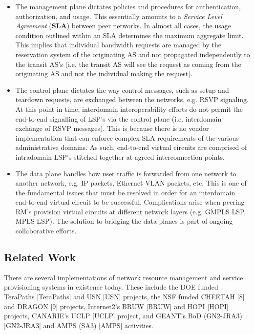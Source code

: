 \documentclass[conference]{IEEEtran}
\begin{document}
\begin{itemize}
\item
The management plane dictates policies and procedures for authentication, 
authorization, and usage.  This essentially amounts to a \emph{Service Level 
Agreement} (\textbf{SLA}) between peer networks.  In almost all cases, the 
usage 
condition outlined within an SLA determines the maximum aggregate limit.  
This implies that individual bandwidth requests are managed by the reservation 
system of the originating AS and not propagated independently to the transit 
AS's 
(i.e. the transit AS will see the request as coming from the originating AS and not the individual making the request).

\item
The control plane dictates the way control messages, such as setup and 
teardown requests, are exchanged between the networks, e.g. RSVP signaling.
At this point in time, interdomain interoperability efforts do not permit
the end-to-end signalling of LSP's via the control plane (i.e. interdomain 
exchange of RSVP messages).  This is because
there is no vendor implementation that can enforce complex SLA requirements of 
the various administrative domains.  As such, end-to-end virtual circuits are
comprised
of intradomain LSP's stitched together at agreed interconnection points.

\item
The data plane handles how user traffic is forwarded from one network to 
another network, e.g. IP packets, Ethernet VLAN packets, etc.  This is one of 
the fundamental issues that must be resolved in order for an interdomain 
end-to-end virtual circuit to be successful.  Complications arise when 
peering RM's provision virtual circuits at different network layers (e.g. 
GMPLS LSP, MPLS LSP).  The solution to bridging the data planes is part of 
ongoing collaborative efforts.
\end{itemize}


\subsection{Related Work}

There are several implementations of network resource management and
service provisioning systems in existence today.  These include the DOE funded
TeraPaths [TeraPaths] and USN [USN] projects, the NSF funded CHEETAH [8] and
DRAGON [9] projects,
Internet2's BRUW [BRUW] and HOPI [HOPI] projects, CANARIE's UCLP [UCLP] 
project, and GEANT's
BoD (GN2-JRA3) [GN2-JRA3] and AMPS (SA3) [AMPS] activities.
\end{document}
